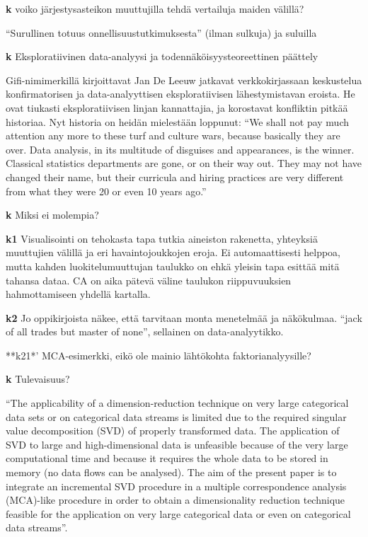 \documentclass[
  finnish,
]{book}
\begin{document}
\textbf{k} voiko järjestysasteikon muuttujilla tehdä vertailuja maiden välillä?

``Surullinen totuus onnellisuustutkimuksesta'' \citet{RefWorks:doc:5c223412e4b0508a6674dec0}
(ilman sulkuja) ja suluilla \citep{RefWorks:doc:5c223412e4b0508a6674dec0}

\textbf{k} Eksploratiivinen data-analyysi ja todennäköisyysteoreettinen päättely

Gifi-nimimerkillä kirjoittavat Jan De Leeuw jatkavat verkkokirjassaan
\citep{RefWorks:doc:5faaf996e4b05416e98ff547} keskustelua konfirmatorisen ja
data-analyyttisen eksploratiivisen lähestymistavan eroista. He ovat tiukasti
eksploratiivisen linjan kannattajia, ja korostavat konfliktin pitkää historiaa.
Nyt historia on heidän mielestään loppunut: ``We shall not pay much attention any
more to these turf and culture wars, because basically they are over. Data
analysis, in its multitude of disguises and appearances, is the winner.
Classical statistics departments are gone, or on their way out. They may not
have changed their name, but their curricula and hiring practices are very
different from what they were 20 or even 10 years ago.''

\textbf{k} Miksi ei molempia?

\textbf{k1} Visualisointi on tehokasta tapa tutkia aineiston rakenetta, yhteyksiä
muuttujien välillä ja eri havaintojoukkojen eroja. Ei automaattisesti helppoa,
mutta kahden luokitelumuuttujan taulukko on ehkä yleisin tapa esittää mitä
tahansa dataa. CA on aika pätevä väline taulukon riippuvuuksien hahmottamiseen
yhdellä kartalla.

\textbf{k2} Jo oppikirjoista näkee, että tarvitaan monta menetelmää ja näkökulmaa.
``jack of all trades but master of none'', sellainen on data-analyytikko.

**k21*' MCA-esimerkki, eikö ole mainio lähtökohta faktorianalyysille?

\textbf{k} Tulevaisuus?

``The applicability of a dimension-reduction technique on very large categorical
data sets or on categorical data streams is limited due to the required singular
value decomposition (SVD) of properly transformed data. The application of SVD
to large and high-dimensional data is unfeasible because of the very large
computational time and because it requires the whole data to be stored in memory
(no data flows can be analysed). The aim of the present paper is to integrate an
incremental SVD procedure in a multiple correspondence analysis (MCA)-like
procedure in order to obtain a dimensionality reduction technique feasible for
the application on very large categorical data or even on categorical
data streams''\citep{RefWorks:doc:5f01c74be4b0d3d8328c72ca}.
\end{document}

